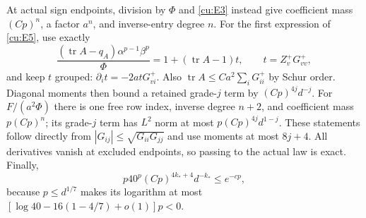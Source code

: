 \documentclass[10pt]{article}
\numberwithin{equation}{section}
\newcommand{\1}{\mathbf1}
\begin{document}
At actual sign endpoints, division by $\Phi$ and \eqref{cu:E3} instead
give coefficient mass $(Cp)^n$, a factor $a^n$, and inverse-entry
degree $n$. For the first expression of \eqref{cu:E5}, use exactly
\[
 \frac{(\operatorname{tr}A-q_A)\alpha^{p-1}\beta^p}{\Phi}
   =1+(\operatorname{tr}A-1)t,\qquad t=Z_v^+G^+_{vv},
\]
and keep $t$ grouped: $\partial_i t=-2atG^+_{vi}$.
Also $\operatorname{tr}A\le Ca^2\sum_iG^+_{ii}$ by Schur order.
Diagonal moments then bound a retained grade-$j$ term by
$(Cp)^{4j}d^{-j}$. For $F/(a^2\Phi)$ there is one free row index,
inverse degree $n+2$, and coefficient mass $p(Cp)^n$; its grade-$j$
term has $L^2$ norm at most $p(Cp)^{4j}d^{1-j}$.
These statements follow directly from
$|G_{ij}|\le\sqrt{G_{ii}G_{jj}}$ and use moments at most $8j+4$.
All derivatives vanish at excluded endpoints, so passing to the actual
law is exact. Finally,
\[
 p40^p(Cp)^{4k_*+4}d^{-k_*}\le e^{-cp},
 \tag{E6}\label{cu:E6}
\]
because $p\le d^{1/7}$ makes its logarithm at most
$[\log40-16(1-4/7)+o(1)]p<0$.
\end{document}
